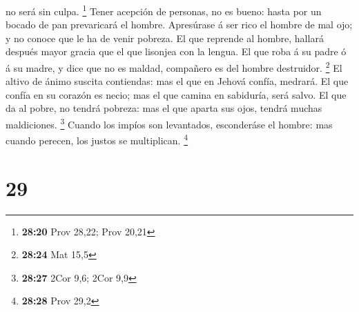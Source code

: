 no será sin culpa. \footnote{\textbf{28:20} Prov 28,22; Prov 20,21}
 Tener acepción de personas, no es bueno: hasta por un
bocado de pan prevaricará el hombre.  Apresúrase á ser rico
el hombre de mal ojo; y no conoce que le ha de venir pobreza.
 El que reprende al hombre, hallará después mayor gracia
que el que lisonjea con la lengua.  El que roba á su padre
ó á su madre, y dice que no es maldad, compañero es del hombre
destruidor. \footnote{\textbf{28:24} Mat 15,5}  El altivo
de ánimo suscita contiendas: mas el que en Jehová confía, medrará.
 El que confía en su corazón es necio; mas el que camina en
sabiduría, será salvo.  El que da al pobre, no tendrá
pobreza: mas el que aparta sus ojos, tendrá muchas maldiciones.
\footnote{\textbf{28:27} 2Cor 9,6; 2Cor 9,9}  Cuando los
impíos son levantados, esconderáse el hombre: mas cuando perecen, los
justos se multiplican. \footnote{\textbf{28:28} Prov 29,2}

\hypertarget{section-28}{%
\section{29}\label{section-28}}

